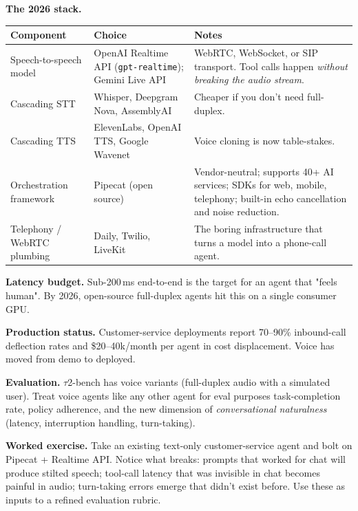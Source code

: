 \documentclass[a4paper,11pt]{article}
\begin{document}
\textbf{The 2026 stack.}

\begin{center}\small
\begin{tabular}{p{3cm} p{4.5cm} p{5cm}}
  \toprule
  \textbf{Component} & \textbf{Choice} & \textbf{Notes} \\
  \midrule
  Speech-to-speech model &
    OpenAI Realtime API (\texttt{gpt-realtime}); Gemini Live API &
    WebRTC, WebSocket, or SIP transport. Tool calls happen
    \emph{without breaking the audio stream}. \\
  \addlinespace
  Cascading STT &
    Whisper, Deepgram Nova, AssemblyAI &
    Cheaper if you don't need full-duplex. \\
  \addlinespace
  Cascading TTS &
    ElevenLabs, OpenAI TTS, Google Wavenet &
    Voice cloning is now table-stakes. \\
  \addlinespace
  Orchestration framework &
    Pipecat (open source) &
    Vendor-neutral; supports 40+ AI services; SDKs for web, mobile,
    telephony; built-in echo cancellation and noise reduction. \\
  \addlinespace
  Telephony / WebRTC plumbing &
    Daily, Twilio, LiveKit &
    The boring infrastructure that turns a model into a phone-call agent. \\
  \bottomrule
\end{tabular}
\end{center}

\textbf{Latency budget.} Sub-200\,ms end-to-end is the target for an
agent that "feels human". By 2026, open-source full-duplex agents
hit this on a single consumer GPU.

\textbf{Production status.} Customer-service deployments report
70–90\% inbound-call deflection rates and \$20–40k/month per agent
in cost displacement. Voice has moved from demo to deployed.

\textbf{Evaluation.} $\tau$2-bench has voice variants (full-duplex
audio with a simulated user). Treat voice agents like any other
agent for eval purposes \textemdash{} task-completion rate, policy
adherence, and the new dimension of \emph{conversational
naturalness} (latency, interruption handling, turn-taking).

\begin{callout}
\textbf{Worked exercise.}
Take an existing text-only customer-service agent and bolt on Pipecat
+ Realtime API. Notice what breaks: prompts that worked for chat
will produce stilted speech; tool-call latency that was invisible in
chat becomes painful in audio; turn-taking errors emerge that didn't
exist before. Use these as inputs to a refined evaluation rubric.
\end{callout}
\end{document}
